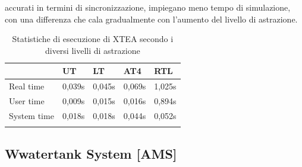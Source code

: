 \documentclass[]{IEEEtran}
\begin{document}
accurati in termini di sincronizzazione, impiegano meno tempo di simulazione, con una differenza che cala gradualmente 
con l'aumento del livello di astrazione.
\begin{table}[]
    \centering
    \begin{tabular}{lllll}
    \toprule
                & UT     & LT     & AT4    & RTL    \\ \hline
    Real time   & 0,039s & 0,045s & 0,069s & 1,025s \\
    User time   & 0,009s & 0,015s & 0,016s & 0,894s \\
    System time & 0,018s & 0,018s & 0,044s & 0,052s \\ \bottomrule
    \\
    \end{tabular}
    \caption{Statistiche di esecuzione di XTEA secondo i diversi livelli di astrazione}
    \label{tab:time}
\end{table}

\subsection{Wwatertank System [AMS]}\label{sec:continuous}
\end{document}
